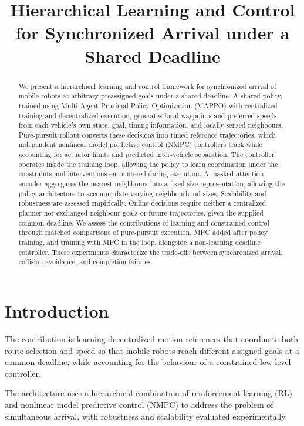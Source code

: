 \documentclass[letterpaper,10pt,conference]{ieeeconf}
\title{\LARGE\bfseries
Hierarchical Learning and Control for Synchronized Arrival
under a Shared Deadline}
\author{}
\date{}
\begin{document}
\maketitle
\thispagestyle{empty}
\pagestyle{empty}

\begin{abstract}
We present a hierarchical learning and control framework for synchronized
arrival of mobile robots at arbitrary preassigned goals under a shared
deadline. A shared policy, trained using Multi-Agent Proximal Policy
Optimization (MAPPO) with centralized training and decentralized execution,
generates local waypoints and preferred speeds from each vehicle's own state,
goal, timing information, and locally sensed neighbours. Pure-pursuit rollout
converts these decisions into timed reference trajectories, which independent
nonlinear model predictive control (NMPC) controllers track while accounting
for actuator limits and predicted inter-vehicle separation. The controller
operates inside the training loop, allowing the policy to learn coordination
under the constraints and interventions encountered during execution. A
masked attention encoder aggregates the nearest neighbours into a fixed-size
representation, allowing the policy architecture to accommodate varying
neighbourhood sizes. Scalability and robustness are assessed empirically.
Online decisions require neither a centralized planner nor exchanged
neighbour goals or future trajectories, given the supplied common deadline.
We assess the contributions of learning and constrained control through
matched comparisons of pure-pursuit execution, MPC added after policy
training, and training with MPC in the loop, alongside a non-learning deadline
controller. These experiments characterize the trade-offs between synchronized
arrival, collision avoidance, and completion failures.
\end{abstract}

\section{Introduction}
\label{sec:introduction}

The contribution is learning decentralized motion references that coordinate
both route selection and speed so that mobile robots reach different assigned
goals at a common deadline, while accounting for the behaviour of a
constrained low-level controller.

The architecture uses a hierarchical combination of reinforcement learning
(RL) and nonlinear model predictive control (NMPC) to address the problem of
simultaneous arrival, with robustness and scalability evaluated experimentally.
\end{document}
